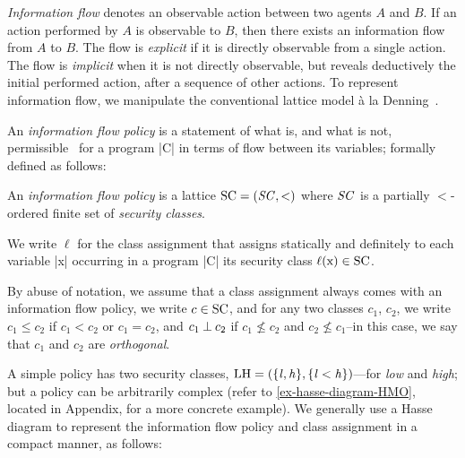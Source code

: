 \emph{Information flow} denotes an observable action between two agents \(A\)
and \(B\). If an action performed by \(A\) is observable to \(B\), then there
exists an information flow from \(A\) to \(B\). The flow is \emph{explicit} if
it is directly observable from a single action. The flow is \emph{implicit} when
it is not directly observable, but reveals deductively the initial performed
action, after a sequence of other actions. To represent information flow, we
manipulate the conventional lattice model à la Denning~\cite{denning76}.

An \emph{information flow policy} is a statement of what is, and what is not,
permissible~\cite{bishop2003} for a program \prc|C| in terms of flow between its
variables; formally defined as follows:

\begin{definition}\label{def:ifp} An \emph{information flow policy} is a lattice \(\mathrm{SC}
= (\mathit{SC}, <)\) where \(\mathit{SC}\) is a partially \(<\)-ordered finite set of
\emph{security classes}.

We write \(\ell\) for the class assignment that assigns statically and
definitely to each variable \prc|x| occurring in a program \prc|C| its security
class \(\lvl{\prc|x|} \in \SC\). \end{definition}

By abuse of notation, we assume that a class assignment always comes with an
information flow policy, we write \(c \in \mathrm{SC}\), and for any two classes
\(c_1\), \(c_2\), we write \(c_1 \leqslant c_2\) if \(c_1 < c_2\) or \(c_1 =
c_2\), and \(c_1 \mathbin{\bot} c_2\) if  \(c_1 \nleqslant c_2\) and \(c_2 \nleqslant
c_1\)--in this case, we say that \(c_1\) and \(c_2\) are \emph{orthogonal}.

A simple policy has two security classes, \eg \(\mathrm{LH}=(\{\mathit{l}, \mathit{h}\},
\{\mathit{l} < \mathit{h}\})\)---for \emph{low} and \emph{high}; but a policy can be
arbitrarily complex (refer to \autoref{ex-hasse-diagram-HMO}, located in
Appendix, for a more concrete example). We generally use a Hasse diagram to
represent the information flow policy and class assignment in a compact manner,
as follows:

